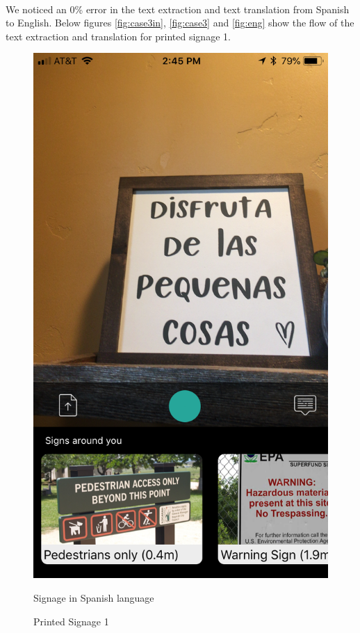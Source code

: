 \documentclass[12pt]{article}
\begin{document}
\paragraph{}We noticed an 0\% error in the text extraction and text translation from Spanish to English. Below figures \ref{fig:case3in}, \ref{fig:case3} and \ref{fig:eng} show the flow of the text extraction and translation for printed signage 1.


 \begin{figure} [H]
\centering
\begin{minipage}{.5\textwidth}
  \centering
  \includegraphics[width=0.9\linewidth]{media/1.png}
  \caption{Printed Signage 1}{Signage in Spanish language}

\end{minipage}
\end{figure}
\end{document}
